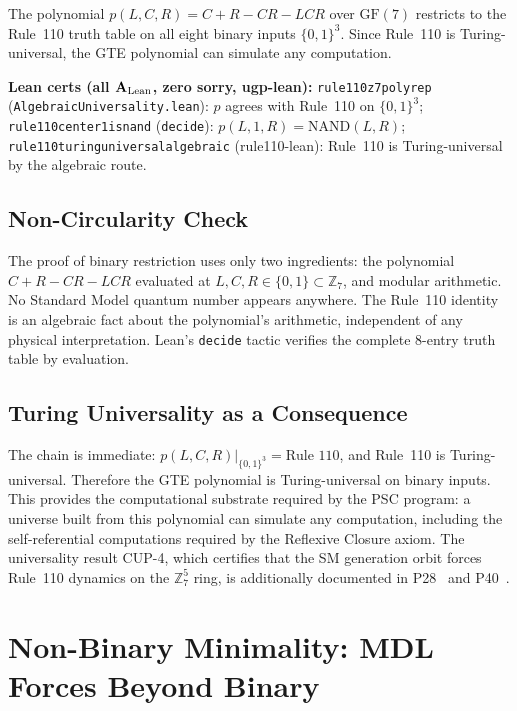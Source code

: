 \documentclass[11pt,openany]{book}
\theoremstyle{remark}
\newcommand{\lean}[1]{%
  \penalty-100
  \begingroup\def\_{\textunderscore\allowbreak}\texttt{#1}\endgroup}
\newcommand{\poly}{p(L,C,R)}
\newcommand{\CatAL}{\ensuremath{\textbf{A}_{\rm Lean}}}
\begin{document}
\begin{tcolorbox}[colback=orange!5,colframe=orange!60,
  title={Result: Binary Universality (\CatAL)}]
The polynomial $\poly = C+R-CR-LCR$ over $\mathrm{GF}(7)$ restricts to the Rule~110
truth table on all eight binary inputs $\{0,1\}^3$. Since Rule~110 is Turing-universal,
the GTE polynomial can simulate any computation.

\smallskip\noindent
\textbf{Lean certs (all \CatAL, zero sorry, ugp-lean):}
\lean{rule110\_z7\_poly\_rep} (\texttt{AlgebraicUniversality.lean}):
$p$ agrees with Rule~110 on $\{0,1\}^3$;
\lean{rule110\_center1\_is\_nand} (\texttt{decide}): $p(L,1,R) = \mathrm{NAND}(L,R)$;
\lean{rule110\_turing\_universal\_algebraic} (rule110-lean): Rule~110 is Turing-universal
by the algebraic route.
\end{tcolorbox}

\subsection*{Non-Circularity Check}

The proof of binary restriction uses only two ingredients: the polynomial
$C+R-CR-LCR$ evaluated at $L,C,R\in\{0,1\} \subset \mathbb{Z}_7$, and modular
arithmetic. No Standard Model quantum number appears anywhere. The Rule~110 identity
is an algebraic fact about the polynomial's arithmetic, independent of any physical
interpretation. Lean's \texttt{decide} tactic verifies the complete 8-entry truth
table by evaluation.

\subsection*{Turing Universality as a Consequence}

The chain is immediate: $p(L,C,R)|_{\{0,1\}^3} = \text{Rule~110}$, and Rule~110 is
Turing-universal. Therefore the GTE polynomial is Turing-universal on binary inputs.
This provides the computational substrate required by the PSC program: a universe
built from this polynomial can simulate any computation, including the self-referential
computations required by the Reflexive Closure axiom. The universality result CUP-4,
which certifies that the SM generation orbit forces Rule~110 dynamics on the
$\mathbb{Z}_7^5$ ring, is additionally documented in P28~\cite{SpivackCompUniversality}
and P40~\cite{SpivackGF7Universality}.

\section{Non-Binary Minimality: MDL Forces Beyond Binary}
\label{sec:nonbinary}
\end{document}
